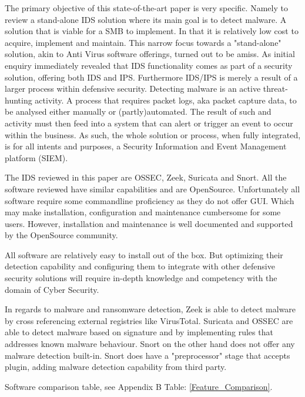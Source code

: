 The primary objective of this state-of-the-art paper is very specific. Namely to review a stand-alone IDS solution where its main goal is to detect malware. A solution that is viable for a SMB to implement. In that it is relatively low cost to acquire, implement and maintain. This narrow focus towards a "stand-alone" solution, akin to Anti Virus software offerings, turned out to be amiss. As initial enquiry immediately revealed that IDS functionality comes as part of a security solution, offering both IDS and IPS. Furthermore IDS/IPS is merely a result of a larger process within defensive security. Detecting malware is an active threat-hunting activity. A process that requires packet logs, aka packet capture data, to be analysed either manually or (partly)automated. The result of such and activity must then feed into a system that can alert or trigger an event to occur within the business. As such, the whole solution or process, when fully integrated, is for all intents and purposes, a Security Information and Event Management platform (SIEM).

The IDS reviewed in this paper are OSSEC, Zeek, Suricata and Snort. All the software reviewed have similar capabilities and are OpenSource. Unfortunately all software require some commandline proficiency as they do not offer GUI. Which may make installation, configuration and maintenance cumbersome for some users. However, installation and maintenance is well documented and supported by the OpenSource community. 

All software are relatively easy to install out of the box. But optimizing their detection capability and configuring them to integrate with other defensive security solutions will require in-depth knowledge and competency with the domain of Cyber Security.

In regards to malware and ransomware detection, Zeek is able to detect malware by cross referencing external registries like VirusTotal. Suricata and OSSEC are able to detect malware based on signature and by implementing rules that addresses known malware behaviour. Snort on the other hand does not offer any malware detection built-in. Snort does have a "preprocessor" stage that accepts plugin, adding malware detection capability from third party.

Software comparison table, see Appendix B Table: \ref{Feature_Comparison}.


